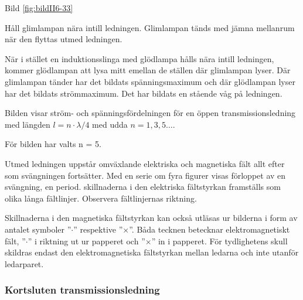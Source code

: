 Bild \ref{fig:bildII6-33}

Håll glimlampan nära intill ledningen. Glimlampan tänds med jämna
mellanrum när den flyttas utmed ledningen.

När i stället en induktionsslinga med glödlampa hålls nära intill
ledningen, kommer glödlampan att lysa mitt emellan de ställen där
glimlampan lyser. Där glimlampan tänder har det bildats
spänningsmaximum och där glödlampan lyser har det bildats
strömmaximum. Det har bildats en stående våg på ledningen.

Bilden visar ström- och spänningsfördelningen för en öppen
transmissionsledning med längden \(l = n\cdot\lambda/4\) med udda \(n
= 1, 3, 5 \dots\).

För bilden har valts n = 5.

Utmed ledningen uppstår omväxlande elektriska och magnetiska fält allt
efter som svängningen fortsätter. Med en serie om fyra figurer visas
förloppet av en svängning, en period. skillnaderna i den elektriska
fältstyrkan framställs som olika långa fältlinjer.  Observera
fältlinjernas riktning.

Skillnaderna i den magnetiska fältstyrkan kan också utläsas ur
bilderna i form av antalet symboler ''\(\cdot\)'' respektive
''\(\times\)''. Båda tecknen betecknar elektromagnetiskt fält, ''\(\cdot\)'' i
riktning ut ur papperet och ''\(\times\)'' in i papperet. För
tydlighetens skull skildras endast den elektromagnetiska fältstyrkan
mellan ledarna och inte utanför ledarparet.

\subsubsection{Kortsluten transmissionsledning}


